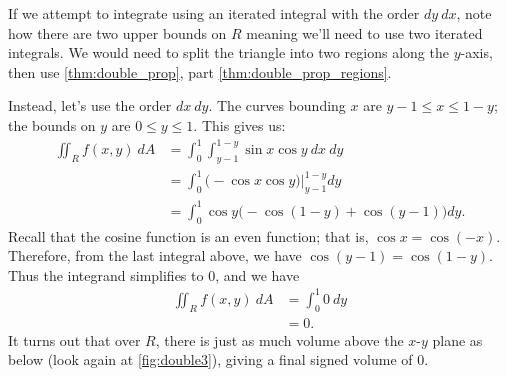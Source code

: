 {If we attempt to integrate using an iterated integral with the order $dy\ dx$, note how there are two upper bounds on $R$ meaning we'll need to use two iterated integrals. We would need to split the triangle into two regions along the $y$-axis, then use \autoref{thm:double_prop}, part \ref{thm:double_prop_regions}.

Instead, let's use the order $dx\ dy$. The curves bounding $x$ are $y-1\leq x\leq 1-y$; the bounds on $y$ are $0\leq y\leq 1$. This gives us:
\begin{align*}
\iint_R f(x,y)\ dA &= \int_0^1\int_{y-1}^{1-y}\sin x\cos y\ dx\ dy\\
		&= \int_0^1\left.\Big( -\cos x\cos y\Big)\right|_{y-1}^{1-y}dy\\
		&= \int_0^1 \cos y\Big(-\cos (1-y) + \cos(y-1)\Big)dy.
\end{align*}
Recall that the cosine function is an even function; that is, $\cos x = \cos (-x)$. Therefore, from the last integral above, we have $\cos (y-1) = \cos (1-y)$. Thus the integrand simplifies to 0, and we have 
\begin{align*}
\iint_R f(x,y)\ dA &= \int_0^1 0\ dy \\
&= 0.
\end{align*}
It turns out that over $R$, there is just as much volume above the $x$-$y$ plane as below (look again at \autoref{fig:double3}), giving a final signed volume of 0.}

